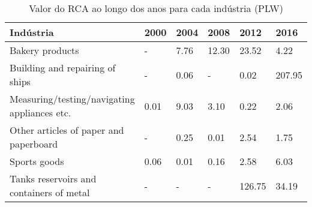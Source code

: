 \begin{table}
\centering
\caption{Valor do RCA ao longo dos anos para cada indústria (PLW)}
\label{tab:ex3-tempo-PLW}
\begin{tabular}{p{6cm}p{1.5cm}p{1.5cm}p{1.5cm}p{1.5cm}p{1.5cm}}
\toprule
                                   Indústria & 2000 & 2004 &  2008 &   2012 &   2016 \\
\midrule
                             Bakery products &    - & 7.76 & 12.30 &  23.52 &   4.22 \\
             Building and repairing of ships &    - & 0.06 &     - &   0.02 & 207.95 \\
Measuring/testing/navigating appliances etc. & 0.01 & 9.03 &  3.10 &   0.22 &   2.06 \\
      Other articles of paper and paperboard &    - & 0.25 &  0.01 &   2.54 &   1.75 \\
                                Sports goods & 0.06 & 0.01 &  0.16 &   2.58 &   6.03 \\
    Tanks reservoirs and containers of metal &    - &    - &     - & 126.75 &  34.19 \\
\bottomrule
\end{tabular}
\end{table}
